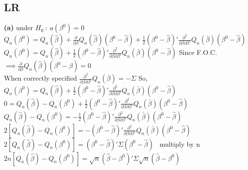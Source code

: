 \documentclass[11pt]{article}
\theoremstyle{definition}
\def\Ho{$H_{0} \ : \ a(\beta^{0})=0$}
\begin{document}
\subsection{LR}

\noindent
\textbf{(a)} under \Ho \\

$Q_{n}(\beta^{0})=Q_{n}(\hat{\beta})+\frac{\partial}{\partial \beta}Q_{n}(\hat{\beta})(\beta^{0}-\hat{\beta})+\frac{1}{2}(\beta^{0}-\hat{\beta})'\frac{\partial^{2}}{\partial \beta \partial \beta'}Q_{n}(\bar{\beta})(\beta^{0}-\hat{\beta})$ \\

$Q_{n}(\beta^{0})=Q_{n}(\hat{\beta})+\frac{1}{2}(\beta^{0}-\hat{\beta})'\frac{\partial^{2}}{\partial \beta \partial \beta'}Q_{n}(\bar{\beta})(\beta^{0}-\hat{\beta})$ Since F.O.C. $\implies \frac{\partial}{\partial \beta}Q_{n}(\hat{\beta})(\beta^{0}-\hat{\beta})=0$ \\

When correctly specified $\frac{\partial^{2}}{\partial \beta \partial \beta'}Q_{n}(\bar{\beta})=-\Sigma$ So,\\

$Q_{n}(\beta^{0})=Q_{n}(\hat{\beta})+\frac{1}{2}(\beta^{0}-\hat{\beta})'\frac{\partial^{2}}{\partial \beta \partial \beta'}Q_{n}(\bar{\beta})(\beta^{0}-\hat{\beta})$ \\

$0=Q_{n}(\hat{\beta})-Q_{n}(\beta^{0})+\frac{1}{2}(\beta^{0}-\hat{\beta})'\frac{\partial^{2}}{\partial \beta \partial \beta'}Q_{n}(\bar{\beta})(\beta^{0}-\hat{\beta})$ \\

$Q_{n}(\hat{\beta})-Q_{n}(\beta^{0})=-\frac{1}{2}(\beta^{0}-\hat{\beta})'\frac{\partial^{2}}{\partial \beta \partial \beta'}Q_{n}(\bar{\beta})(\beta^{0}-\hat{\beta})$ \\

$2\left[Q_{n}(\hat{\beta})-Q_{n}(\beta^{0})\right]=-(\beta^{0}-\hat{\beta})'\frac{\partial^{2}}{\partial \beta \partial \beta'}Q_{n}(\bar{\beta})(\beta^{0}-\hat{\beta})$ \\

$2\left[Q_{n}(\hat{\beta})-Q_{n}(\beta^{0})\right]=(\beta^{0}-\hat{\beta})'\Sigma(\beta^{0}-\hat{\beta})$ \ multiply by n \\

$2n\left[Q_{n}(\hat{\beta})-Q_{n}(\beta^{0})\right]=\sqrt{n}(\hat{\beta}-\beta^{0})'\Sigma\sqrt{n}(\hat{\beta}-\beta^{0})$ \\ 
\end{document}

